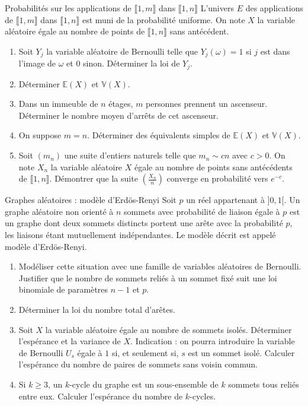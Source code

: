 \documentclass[french,a4paper]{article}
\newcommand{\E}{\mathbb{E}}
\newcommand{\V}{\mathbb{V}}
\theoremstyle{plain}
\theoremstyle{definition}
\theoremstyle{remark}
\begin{document}
\begin{ex}[Châteaux]{Probabilités sur les applications de $\llbracket1,m\rrbracket$ dans $\llbracket1,n\rrbracket$}
	L'univers $E$ des applications de $\llbracket1,m\rrbracket$ dans $\llbracket1,n\rrbracket$ est muni de la probabilité uniforme. On note $X$ la variable aléatoire égale au nombre de points de $\llbracket1,n\rrbracket$ sans antécédent.
	\begin{enumerate}
		\item Soit $Y_j$ la variable aléatoire de Bernoulli telle que $Y_j(\omega)=1$ si $j$ est dans l'image de $\omega$ et $0$ sinon. Déterminer la loi de $Y_j$.
		\item Déterminer $\E(X)$ et $\V(X)$.
		\item Dans un immeuble de $n$ étages, $m$ personnes prennent un ascenseur. Déterminer le nombre moyen d'arrêts de cet ascenseur.
		\item On suppose $m=n$. Déterminer des équivalents simples de $\E(X)$ et $\V(X)$.
		\item Soit $(m_n)$ une suite d'entiers naturels telle que $m_n\sim cn$ avec $c>0$. On note $X_n$ la variable aléatoire $X$ égale au nombre de points sans antécédents de $\llbracket1,n\rrbracket$. Démontrer que la suite $\displaystyle\left(\frac{X_n}{n}\right)$ converge en probabilité vers $e^{-c}$.
	\end{enumerate}
\end{ex}
\begin{ex}[Châteaux]{Graphes aléatoires : modèle d'Erdös-Renyi}
	Soit $p$ un réel appartenant à $]0,1[$. Un graphe aléatoire non orienté à $n$ sommets avec probabilité de liaison égale à $p$ est un graphe dont deux sommets distincts portent une arête avec la probabilité $p$, les liaisons étant mutuellement indépendantes. Le modèle décrit est appelé modèle d'Erdös-Renyi.
	\begin{enumerate}
		\item Modéliser cette situation avec une famille de variables aléatoires de Bernoulli. Justifier que le nombre de sommets reliés à un sommet fixé suit une loi binomiale de paramètres $n-1$ et $p$.
		\item Déterminer la loi du nombre total d'arêtes.
		\item Soit $X$ la variable aléatoire égale au nombre de sommets isolés. Déterminer l'espérance et la variance de $X$. Indication : on pourra introduire la variable de Bernoulli $U_s$ égale à $1$ si, et seulement si, $s$ est un sommet isolé. Calculer l'espérance du nombre de paires de sommets sans voisin commun.
		\item Si $k\geqslant 3$, un $k$-cycle du graphe est un sous-ensemble de $k$ sommets tous reliés entre eux. Calculer l'espérance du nombre de $k$-cycles. 
	\end{enumerate}
\end{ex}
\end{document}
